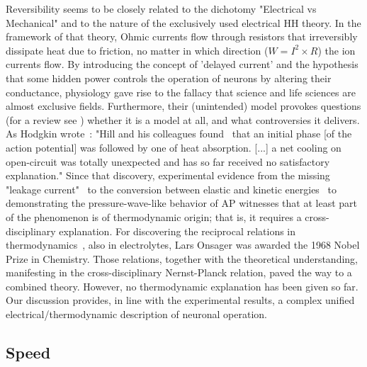 {
Reversibility seems to be
closely related to the dichotomy "Electrical vs Mechanical"
and to the nature of the exclusively used electrical
\gls{HH} theory. In the framework of that
theory, Ohmic currents flow through resistors that irreversibly dissipate heat due to
friction, no matter in which direction ($W=I^2\times R$) the ion currents flow. 
By introducing the concept of
'delayed current' and the hypothesis that some hidden power controls the operation
of neurons by altering their conductance, physiology gave rise to the fallacy that science and life sciences are almost exclusive fields.
Furthermore, their (unintended) model provokes questions (for a review
see \cite{HH_Potential_Controversies_2017}) whether it is a model
at all, and what controversies it delivers.  
As Hodgkin wrote~\cite{HodgkinConduction:1964}: "Hill and his colleagues found~\cite{HeatProductionNeuron:1958} that an initial phase [of the action potential] was followed by one of
heat absorption. [...] a net cooling on open-circuit was totally unexpected
and has so far received no satisfactory explanation."
Since that discovery, experimental evidence from the missing "leakage current"~\cite{EnergyNeuralCommunication:2021} to the conversion between
elastic and kinetic energies~\cite{MechanicalWaves:2015} to demonstrating 
the pressure-wave-like behavior of \gls{AP} witnesses that 
at least part of the phenomenon is of thermodynamic origin;
that is, it requires a cross-disciplinary explanation.
For discovering the reciprocal relations in thermodynamics~\cite{OnsagerExperimental:1959}, also in electrolytes, Lars Onsager was awarded the 1968 Nobel Prize in Chemistry.
Those relations, together with the theoretical understanding,
manifesting in the cross-disciplinary Nernst-Planck relation,
paved the way to a combined theory.
However, no thermodynamic explanation has been given so far.
Our discussion provides, in line with the experimental results,
a complex unified electrical/thermodynamic description of neuronal operation.
}


\subsection{Speed\label{sec:Physics-Speeds}}

